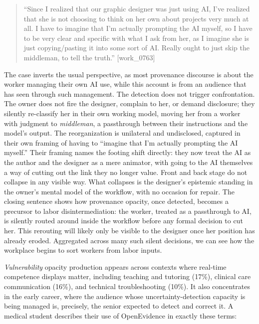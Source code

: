 \documentclass[pdflatex,sn-basic]{sn-jnl}%
\theoremstyle{thmstyleone}%
\theoremstyle{thmstyletwo}%
\theoremstyle{thmstylethree}%
\begin{document}
\begin{quote}
``Since I realized that our graphic designer was just using AI, I've realized that she is not choosing to think on her own about projects very much at all. I have to imagine that I'm actually prompting the AI myself, so I have to be very clear and specific with what I ask from her, as I imagine she is just copying/pasting it into some sort of AI. Really ought to just skip the middleman, to tell the truth.'' [work\_0763]
\end{quote}

The case inverts the usual perspective, as most provenance discourse is about the worker managing their own AI use, while this account is from an audience that has seen through such management. The detection does not trigger confrontation. The owner does not fire the designer, complain to her, or demand disclosure; they silently re-classify her in their own working model, moving her from a worker with judgment to \textit{middleman}, a passthrough between their instructions and the model's output. The reorganization is unilateral and undisclosed, captured in their own framing of having to ``imagine that I'm actually prompting the AI myself.'' Their framing names the footing shift directly: they now treat the AI as the author and the designer as a mere animator, with going to the AI themselves a way of cutting out the link they no longer value. Front and back stage do not collapse in any visible way. What collapses is the designer's epistemic standing in the owner's mental model of the workflow, with no occasion for repair. The closing sentence shows how provenance opacity, once detected, becomes a precursor to labor disintermediation: the worker, treated as a passthrough to AI, is silently routed around inside the workflow before any formal decision to cut her.
This rerouting will likely only be visible to the designer once her position has already eroded. Aggregated across many such silent decisions, we can see how the workplace begins to sort workers from labor inputs.

\textit{Vulnerability} opacity production appears across contexts where real-time competence displays matter, including teaching and tutoring (17\%), clinical care communication (16\%), and technical troubleshooting (10\%). It also concentrates in the early career, where the audience whose uncertainty-detection capacity is being managed is, precisely, the senior expected to detect and correct it. A medical student describes their use of OpenEvidence in exactly these terms:
\end{document}
